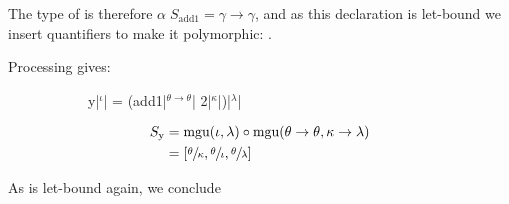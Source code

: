 \documentclass[dissertation.tex]{subfiles}
\begin{document}
{{{            The type of  is therefore \(\alpha \; S_\text{add1} = \gamma\rightarrow\gamma\), and as this
            declaration is let-bound we insert quantifiers to make it polymorphic: .

            Processing  gives:

            \begin{figure}[H]
            \begin{subfigure}[c]{\textwidth}
                \centering
                \begin{haskellfigure}
                y|\(^\iota\)| = (add1|\(^{\theta\rightarrow\theta}\)| 2|\(^\kappa\)|)|\(^\lambda\)|
                \end{haskellfigure}
            \end{subfigure}

            \begin{subfigure}[c]{\textwidth}
                \centering
                \begin{equation*}
                \begin{split}
                    S_\text{y} & = \text{mgu}(\iota, \lambda) \circ \text{mgu}(\theta\rightarrow\theta, \kappa\rightarrow\lambda) \\
                               & = [\sfrac{\theta}{\kappa}, \sfrac{\theta}{\iota}, \sfrac{\theta}{\lambda}]
                \end{split}
                \end{equation*}
            \end{subfigure}
            \end{figure}

            As  is let-bound again, we conclude 

            

        }


    }
}
\end{document}
